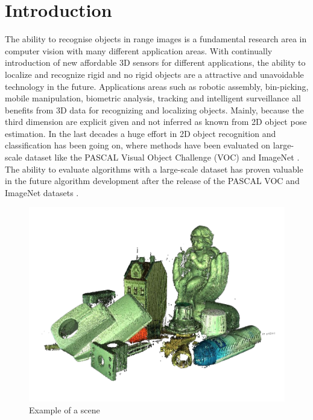 \documentclass[10pt,twocolumn,letterpaper]{article}
\begin{document}
\section{Introduction} %
The ability to recognise objects in range images is a fundamental research area in computer vision with many different application areas. With continually introduction of new affordable 3D sensors for different applications, the ability to localize and recognize rigid and no rigid objects are a attractive and unavoidable technology in the future. Applications areas such as robotic assembly, bin-picking, mobile manipulation, biometric analysis, tracking and intelligent surveillance all benefits from 3D data for recognizing and localizing objects. Mainly, because the third dimension are explicit given and not inferred as known from 2D object pose estimation. In the last decades a huge effort in 2D object recognition and classification has been going on, where methods have been evaluated on large-scale dataset like the PASCAL Visual Object Challenge (VOC) \cite{Everingham2014} and ImageNet \cite{Imagenet2009}. The ability to evaluate algorithms with a large-scale dataset has proven valuable in the future algorithm development after the release of the PASCAL VOC and ImageNet datasets \cite{Everingham2014}.
\begin{figure}[t]
\centering
\includegraphics[width=0.8\linewidth, height= 0.8\linewidth, keepaspectratio]{img/scenes/scene_000.pdf}
\caption{Example of a scene}
\label{fig:scene}
\end{figure}
\end{document}
